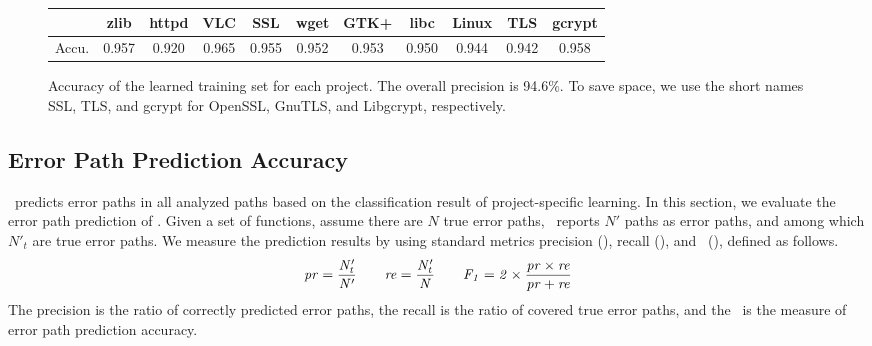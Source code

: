 \documentclass[12pt]{report}	%
\begin{document}
\begin{figure}[t]
\centering
\begin{tabular}{l | c | c | c |c |c|c|c|c|c|c}
\toprule
& zlib & httpd & VLC & SSL & wget & GTK+ & libc & Linux & TLS & gcrypt \\
\midrule
Accu. & 0.957 & 0.920 & 0.965 & 0.955 & 0.952 & 0.953 & 0.950 & 0.944 & 0.942 & 0.958 \\
\bottomrule
\end{tabular}
\caption[Accuracy of LTS for each project]{Accuracy of the learned training set for each project.
The overall precision is 94.6\%.
To save space, we use the short names SSL, TLS, and gcrypt for
OpenSSL, GnuTLS, and Libgcrypt, respectively.}
\label{tab:evallabeling}
\end{figure}

\subsection{Error Path Prediction Accuracy}
\label{sec:app:eval:phase2}

\newTool\ predicts error paths in all analyzed paths based on the classification result 
of project-specific learning.
In this section, we evaluate the error path prediction of \newTool.
%
%
Given a set of functions, assume there are $N$ true error paths,
\newTool\ reports $N'$ paths as error paths, and among which 
$N'_t$ are true error paths.
We measure the prediction results by using standard metrics precision
(\pr), recall (\re), and \accu\ (\fone), defined as follows.
\[
\it{pr} = \frac{N'_t}{N'} 
\qquad
\it{re} = \frac{N'_t}{N}
\qquad
\it{\ensuremath{F_1}} = 2 \times \frac{\it{pr} \times \it{re}}{\it{pr} + \it{re}}
\]
%
The precision is the ratio of correctly predicted error paths,
the recall is the ratio of covered true error paths, and the 
\fone\ is the measure of error path prediction accuracy.
\end{document}
